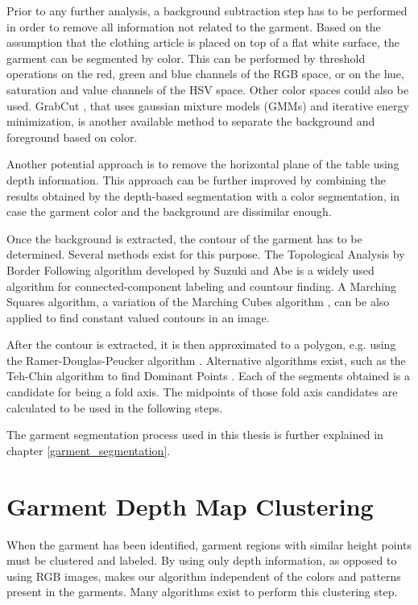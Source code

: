 Prior to any further analysis, a background subtraction step has to be performed in order to remove all information not related to the garment. Based on the assumption that the clothing article is placed on top of a flat white surface, the garment can be segmented by color. This can be performed by threshold operations on the red, green and blue channels of the RGB space, or on the hue, saturation and value channels of the HSV space. Other color spaces could also be used. GrabCut \cite{rother2004grabcut}, that uses gaussian mixture models (GMMs) and iterative energy minimization, is another available method to separate the background and foreground based on color.

Another potential approach is to remove the horizontal plane of the table using depth information. This approach can be further improved by combining the results obtained by the depth-based segmentation with a color segmentation, in case the garment color and the background are dissimilar enough.

Once the background is extracted, the contour of the garment has to be determined. Several methods exist for this purpose. The Topological Analysis by Border Following algorithm developed by Suzuki and Abe \cite{suzuki1985topological} is a widely used algorithm for connected-component labeling and countour finding. A Marching Squares algorithm, a variation of the Marching Cubes algorithm \cite{lorensen1987marching}, can be also applied to find constant valued contours in an image.

After the contour is extracted, it is then approximated to a polygon, e.g. using the Ramer-Douglas-Peucker algorithm \cite{ramer1972iterative, douglas1973algorithms}. Alternative algorithms exist, such as the Teh-Chin algorithm to find Dominant Points \cite{teh1989detection}. Each of the segments obtained is a candidate for being a fold axis. The midpoints of those fold axis candidates are calculated to be used in the following steps.

The garment segmentation process used in this thesis is further explained in chapter \ref{garment_segmentation}.

\section{Garment Depth Map Clustering}
\label{architecture:depth_map_clustering}
When the garment has been identified, garment regions with similar height points must be clustered and labeled. By using only depth information, as opposed to using RGB images, makes our algorithm independent of the colors and patterns present in the garments. Many algorithms exist to perform this clustering step.

